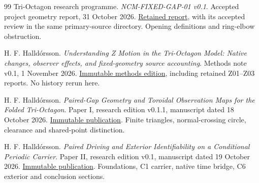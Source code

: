 \begin{thebibliography}{99}
 Tri-Octagon research programme.
\emph{NCM-FIXED-GAP-01 v0.1}. Accepted project geometry report, 31 October 2026.
\href{https://github.com/pzychozen/trioctagon-physics/blob/c881b682ef6a8128dd1dc316d1850b9aeb1e1c8b/papers/PHASE_RECONSTRUCTION_AND_STATIONARY_SUPPORT_AXES/publication/v0.1/provenance/primary/fixed_gap_report.md}{Retained report}, with its accepted review in the same primary-source directory. Opening definitions and ring-elbow obstruction.

 H. F. Halld\'orsson.
\emph{Understanding Z Motion in the Tri-Octagon Model: Native changes, observer effects, and fixed-geometry source accounting}. Methods note v0.1, 1 November 2026.
\href{https://github.com/pzychozen/trioctagon-physics/tree/c881b682ef6a8128dd1dc316d1850b9aeb1e1c8b/docs/methods/Z_MOTION/v0.1}{Immutable methods edition}, including retained Z01--Z03 reports. No history rerun here.

 H. F. Halld\'orsson.
\emph{Paired-Gap Geometry and Toroidal Observation Maps for the Folded Tri-Octagon}. Paper I, research edition v0.1.1, manuscript dated 18 October 2026.
\href{https://github.com/pzychozen/trioctagon-physics/tree/c881b682ef6a8128dd1dc316d1850b9aeb1e1c8b/SRG_REDISCOVERY/PAPERS/PAIRED_GAP_GEOMETRY_OBSERVATION/publication/v0.1.1}{Immutable publication}. Finite triangles, normal-crossing circle, clearance and shared-point distinction.

 H. F. Halld\'orsson.
\emph{Paired Driving and Exterior Identifiability on a Conditional Periodic Carrier}. Paper II, research edition v0.1, manuscript dated 19 October 2026.
\href{https://github.com/pzychozen/trioctagon-physics/tree/c881b682ef6a8128dd1dc316d1850b9aeb1e1c8b/SRG_REDISCOVERY/PAPERS/PAIRED_DRIVING_EXTERIOR_IDENTIFIABILITY/publication/v0.1}{Immutable publication}. Foundations, C1 carrier, native time bridge, C6 exterior and conclusion sections.
\end{thebibliography}
